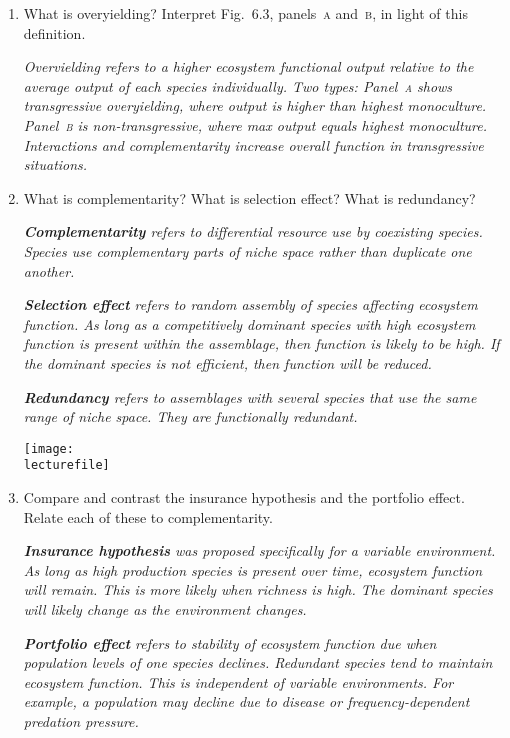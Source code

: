 \documentclass[letterpaper]{tufte-handout}
\newcommand\lecturefile{434_lecture05_instructor}
\begin{document}
\begin{enumerate}
	\item What is overyielding? Interpret Fig.~6.3, panels~\textsc{a} and~\textsc{b}, in light of this definition.
	
	\textit{Overvielding refers to a higher ecosystem functional output relative to the average output of each species individually. Two types: Panel~\textsc{a} shows transgressive overyielding, where output is higher than highest monoculture. Panel~\textsc{b} is non-transgressive, where max output equals highest monoculture. Interactions and complementarity increase overall function in transgressive situations.}
	

	\item What is complementarity? What is selection effect? What is redundancy?
	
	\textit{\textbf{Complementarity} refers to differential resource use by coexisting species. Species use complementary parts of niche space rather than duplicate one another. }
	
	\textit{\textbf{Selection effect} refers to random assembly of species affecting ecosystem function. As long as a competitively dominant species with high ecosystem function is present within the assemblage, then function is likely to be high. If the dominant species is not efficient, then function will be reduced.}
		
	\textit{\textbf{Redundancy} refers to assemblages with several species that use the same range of niche space. They are functionally redundant.}

	\begin{marginfigure}
		\texttt{[image: \\lecturefile]}
	\end{marginfigure}

	\item Compare and contrast the insurance hypothesis and the portfolio effect. Relate each of these to complementarity.
	
	\textit{\textbf{Insurance hypothesis} was proposed specifically for a variable environment. As long as high production species is present over time, ecosystem function will remain. This is more likely when richness is high. The dominant species will likely change as the environment changes.}
	
	\textit{\textbf{Portfolio effect} refers to stability of ecosystem function due when population levels of one species declines. Redundant species tend to maintain ecosystem function. This is independent of variable environments. For example, a population may decline due to disease or frequency-dependent predation pressure.}
	

\end{enumerate}
\end{document}
